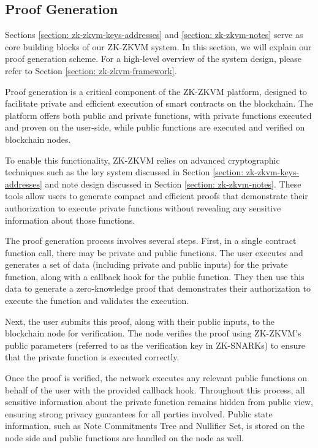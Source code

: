 \subsection{Proof Generation}\label{section: zk-zkvm-user-end-prove}

Sections \ref{section: zk-zkvm-keys-addresses} and \ref{section: zk-zkvm-notes} serve as core building blocks of our ZK-ZKVM system. In this section, we will explain our proof generation scheme. For a high-level overview of the system design, please refer to Section \ref{section: zk-zkvm-framework}.

Proof generation is a critical component of the ZK-ZKVM platform, designed to facilitate private and efficient execution of smart contracts on the blockchain. The platform offers both public and private functions, with private functions executed and proven on the user-side, while public functions are executed and verified on blockchain nodes.

To enable this functionality, ZK-ZKVM relies on advanced cryptographic techniques such as the key system discussed in Section \ref{section: zk-zkvm-keys-addresses} and note design discussed in Section \ref{section: zk-zkvm-notes}. These tools allow users to generate compact and efficient proofs that demonstrate their authorization to execute private functions without revealing any sensitive information about those functions.

The proof generation process involves several steps. First, in a single contract function call, there may be private and public functions. The user executes and generates a set of data (including private and public inputs) for the private function, along with a callback hook for the public function. They then use this data to generate a zero-knowledge proof that demonstrates their authorization to execute the function and validates the execution.

Next, the user submits this proof, along with their public inputs, to the blockchain node for verification. The node verifies the proof using ZK-ZKVM's public parameters (referred to as the verification key in ZK-SNARKs) to ensure that the private function is executed correctly.

Once the proof is verified, the network executes any relevant public functions on behalf of the user with the provided callback hook. Throughout this process, all sensitive information about the private function remains hidden from public view, ensuring strong privacy guarantees for all parties involved. Public state information, such as Note Commitments Tree and Nullifier Set, is stored on the node side and public functions are handled on the node as well.

